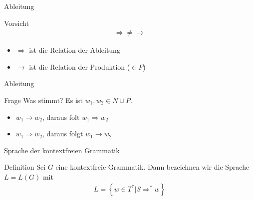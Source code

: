 \begin{frame}{Ableitung}
    \begin{alertblock}{Vorsicht}
        \begin{align*}
            \Rightarrow \neq \rightarrow
        \end{align*}
        \begin{itemize}
            \item $\Rightarrow$ ist die Relation der Ableitung
            \item $\rightarrow$ ist die Relation der Produktion ($\in P$)
        \end{itemize}
    \end{alertblock}
\end{frame}

\begin{frame}{Ableitung}
    \begin{block}{Frage}
        Was stimmt? Es ist $w_1, w_2 \in N \cup P$.
        \begin{itemize}
            \item $w_1 \rightarrow w_2$, daraus folt $w_1 \Rightarrow w_2$
            \item $w_1 \Rightarrow w_2$, daraus folgt $w_1 \rightarrow w_2$
        \end{itemize}
    \end{block}
\end{frame}

\begin{frame}{Sprache der kontextfreien Grammatik}
    \begin{block}{Definition}
        Sei $G$ eine kontextfreie Grammatik. Dann bezeichnen wir die Sprache $L = L\left(G\right)$ mit 
        \begin{align*}
            L = \left\{ w\in T^* \big| S \Rightarrow^* w\right\}
        \end{align*}
    \end{block}
    \pause
\end{frame}

